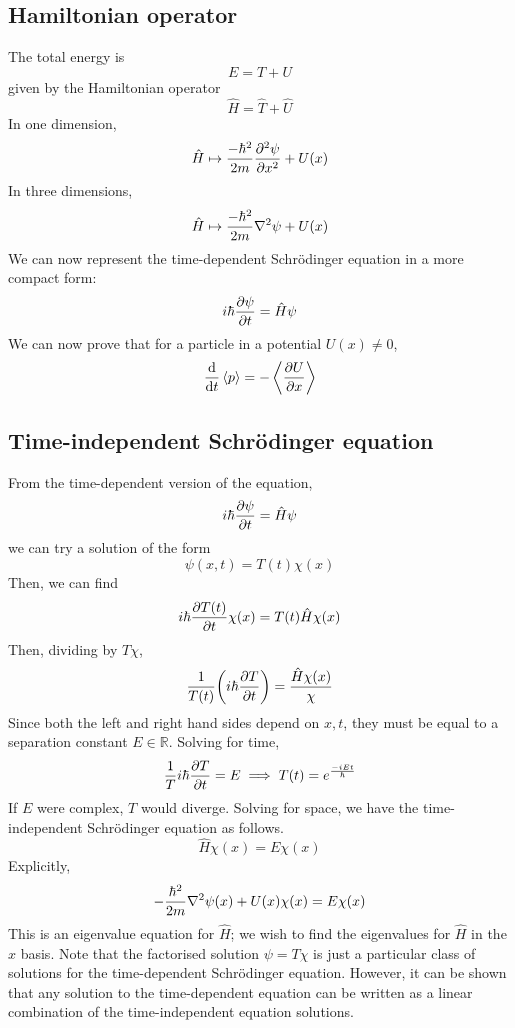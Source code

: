 \subsection{Hamiltonian operator}
The total energy is
\[
	E = T + U
\]
given by the Hamiltonian operator
\[
	\hat H = \hat T + \hat U
\]
In one dimension,
\[
	\hat H \mapsto \frac{-\hbar^2}{2m} \pdv[2]{\psi}{x} + U(x)
\]
In three dimensions,
\[
	\hat H \mapsto \frac{-\hbar^2}{2m} \laplacian \psi + U(x)
\]
We can now represent the time-dependent Schr\"odinger equation in a more compact form:
\[
	i\hbar \pdv{\psi}{t} = \hat H \psi
\]
We can now prove that for a particle in a potential \( U(x) \neq 0 \),
\[
	\dv{t} \left\langle{p}\right\rangle = -\left\langle{\pdv{U}{x}}\right\rangle
\]

\subsection{Time-independent Schr\"odinger equation}
From the time-dependent version of the equation,
\[
	i\hbar \pdv{\psi}{t} = \hat H \psi
\]
we can try a solution of the form
\[
	\psi(x,t) = T(t) \chi(x)
\]
Then, we can find
\[
	i \hbar \pdv{T(t)}{t} \chi(x) = T(t) \hat H \chi(x)
\]
Then, dividing by \( T \chi \),
\[
	\frac{1}{T(t)} \qty(i \hbar \pdv{T}{t}) = \frac{\hat H \chi(x)}{\chi}
\]
Since both the left and right hand sides depend on \( x, t \), they must be equal to a separation constant \( E \in \mathbb R \).
Solving for time,
\[
	\frac{1}{T} i \hbar \pdv{T}{t} = E \implies T(t) = e^{\frac{-i Et}{\hbar}}
\]
If \( E \) were complex, \( T \) would diverge.
Solving for space, we have the time-independent Schr\"odinger equation as follows.
\[
	\hat H \chi(x) = E \chi(x)
\]
Explicitly,
\[
	-\frac{\hbar^2}{2m} \laplacian{\psi(x)} + U(x) \chi(x) = E \chi(x)
\]
This is an eigenvalue equation for \( \hat H \); we wish to find the eigenvalues for \( \hat H \) in the \( x \) basis.
Note that the factorised solution \( \psi = T \chi \) is just a particular class of solutions for the time-dependent Schr\"odinger equation.
However, it can be shown that any solution to the time-dependent equation can be written as a linear combination of the time-independent equation solutions.
